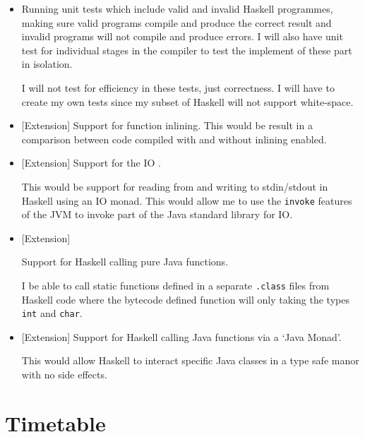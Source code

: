 \documentclass[a4paper]{article}
\begin{document}
  \begin{itemize}

    \item
      Running unit tests which include valid and invalid Haskell programmes, making sure valid programs compile and produce the correct result and invalid
      programs will not compile and produce errors. I will also have unit test for individual stages in the compiler to test the implement of these part in
      isolation.

      I will not test for efficiency in these tests, just correctness. I will have to create my own tests since my subset of Haskell will not support white-space.

    \item 
      
      [Extension] Support for function inlining. This would be result in a comparison between code compiled with and without inlining enabled.
      

    \item 

      [Extension] Support for the IO .

      This would be support for reading from and writing to stdin/stdout in Haskell using an IO monad. This would allow me to use the \texttt{invoke} features
      of the JVM to invoke part of the Java standard library for IO.

    \item 

      [Extension]

      Support for Haskell calling pure Java functions. 

      I be able to call static functions defined in a separate \texttt{.class} files from Haskell code where the bytecode defined function will
      only taking the types \texttt{int} and \texttt{char}.

    \item
      
      [Extension] Support for Haskell calling Java functions via a `Java Monad'.
       
      This would allow Haskell to interact specific Java classes in a type safe manor with no side effects.

  \end{itemize}

  \section*{Timetable}
\end{document}
